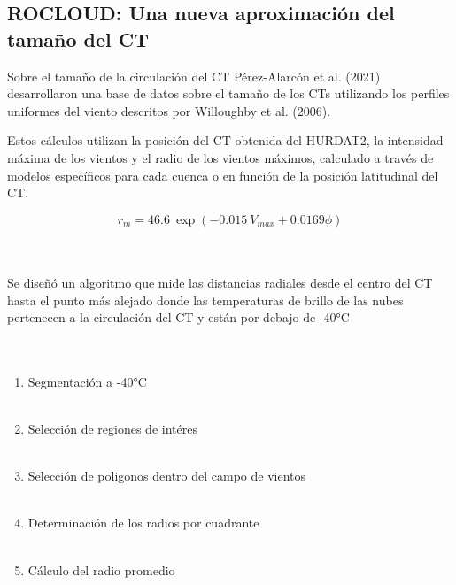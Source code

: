 \subsection{ROCLOUD: Una nueva aproximación del tamaño del CT}
\begin{frame}
    \begin{block}{Sobre el tamaño de la circulación del CT}
        Pérez-Alarcón et al. (2021) desarrollaron una base de datos sobre el tamaño de los CTs utilizando los perfiles uniformes del viento descritos por Willoughby et al. (2006). \bigskip

        Estos cálculos utilizan la posición del CT obtenida del HURDAT2, la intensidad máxima de los vientos y el radio de los vientos máximos, calculado a través de modelos específicos para cada cuenca o en función de la posición latitudinal del CT.

    \begin{equation}
        \label{eq:2.1}
        r_{m} =  46.6 \ \exp{(-0.015 \ V_{max} + 0.0169 \phi)}
    \end{equation}
        \\~\
    \end{block}

\end{frame}

\begin{frame}
    Se diseñó un algoritmo que mide las distancias radiales desde el centro del CT hasta el punto más alejado donde las temperaturas de brillo de las nubes pertenecen a la circulación del CT y están por debajo de -40°C
    \\~\ 
    \\~\ 
\begin{enumerate}
    \item<1-> Segmentación a -40°C
     \\~\
    \item<2-> Selección de regiones de intéres
     \\~\
    \item<3-> Selección de poligonos dentro del campo de vientos
     \\~\
    \item<4-> Determinación de los radios por cuadrante
     \\~\
    \item<4-> Cálculo del radio promedio
\end{enumerate}
\end{frame}

